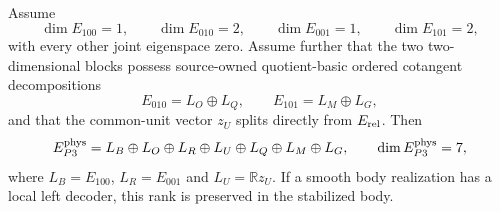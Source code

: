 \begin{theorem}
\label{thm:p3supportportparent}
Assume
\begin{equation}
 \dim E_{100}=1,\qquad \dim E_{010}=2,\qquad
 \dim E_{001}=1,\qquad \dim E_{101}=2,
 \label{eq:p3supportmultiplicities}
\end{equation}
with every other joint eigenspace zero.  Assume further that the two
two-dimensional blocks possess source-owned quotient-basic ordered
cotangent decompositions
\begin{equation}
 E_{010}=L_O\oplus L_Q,
 \qquad E_{101}=L_M\oplus L_G,
 \label{eq:p3orderedports}
\end{equation}
and that the common-unit vector $z_U$ splits directly from $E_{\rm rel}$.
Then
\begin{equation}
 E_{P3}^{\rm phys}
 =L_B\oplus L_O\oplus L_R\oplus L_U
  \oplus L_Q\oplus L_M\oplus L_G,
 \qquad \dim E_{P3}^{\rm phys}=7,
 \label{eq:p3supportportrankseven}
\end{equation}
where $L_B=E_{100}$, $L_R=E_{001}$ and $L_U=\mathbb Rz_U$.
If a smooth body realization has a local left decoder, this rank is
preserved in the stabilized body.


\end{theorem}
